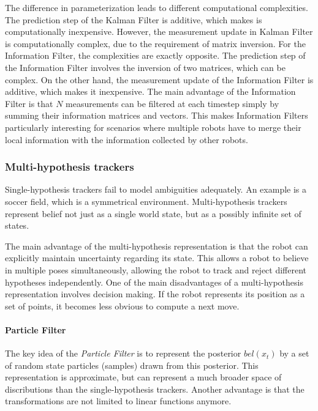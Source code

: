 {The difference in parameterization leads to different computational complexities.
The prediction step of the Kalman Filter is additive, which makes is computationally inexpensive.
However, the measurement update in Kalman Filter is computationally complex, due to the requirement of matrix inversion.
For the Information Filter, the complexities are exactly opposite.
The prediction step of the Information Filter involves the inversion of two matrices, which can be complex.
On the other hand, the measurement update of the Information Filter is additive, which makes it inexpensive.
The main advantage of the Information Filter is that $N$ measurements can be filtered at each timestep simply by summing their information matrices and vectors.
This makes Information Filters particularly interesting for scenarios where multiple robots have to merge their local information with the information collected by other robots.


\subsubsection{Multi-hypothesis trackers}
Single-hypothesis trackers fail to model ambiguities adequately.
An example is a soccer field, which is a symmetrical environment.
Multi-hypothesis trackers represent belief not just as a single world state, but as a possibly infinite set of states.

The main advantage of the multi-hypothesis representation is that the robot can explicitly maintain uncertainty regarding its state.
This allows a robot to believe in multiple poses simultaneously, allowing the robot to track and reject different hypotheses independently.
One of the main disadvantages of a multi-hypothesis representation involves decision making.
If the robot represents its position as a set of points, it becomes less obvious to compute a next move.

\paragraph{Particle Filter}
The key idea of the \textit{Particle Filter}  is to represent the posterior $bel(x_t)$ by a set of random state particles (samples) drawn from this posterior.
This representation is approximate, but can represent a much broader space of discributions than the single-hypothesis trackers.
Another advantage is that the transformations are not limited to linear functions anymore.

}
